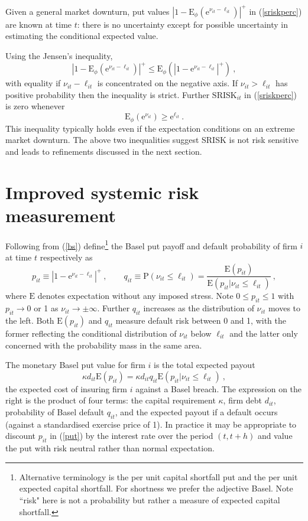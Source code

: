 \documentclass[authoryear]{elsarticle}
\newcommand{\E}{\mathrm{E}}
\newcommand{\p}{\mathrm{P}}
\newcommand{\e}{\mathrm{e}}
\newcommand{\Es}{\E_\phi}
\newcommand{\eref}[1]{(\ref{#1})}
\newcommand{\cq}{\ , \qquad}
\newcommand{\be}[1]{\begin{equation}\label{#1}}
\newcommand{\ee}{\end{equation}}
\begin{document}
Given a general market downturn, put values $|1-\Es(\e^{\nu_{it}-\ell_{it}})|^+$  in \eref{sriskperc} are known at time $t$:  there is no uncertainty except for possible  uncertainty in estimating the conditional  expected value.

Using the Jensen's inequality,
$$
\left|1-\Es(\e^{\nu_{it}-\ell_{it}})\right|^+ \le\Es\left(\left|1-\e^{\nu_{it}-\ell_{it}}\right|^+\right)\ ,
$$
with equality  if  $\nu_{it}-\ell_{it}$ is concentrated on the negative axis.  If  $\nu_{it}>\ell_{it}$  has positive probability then the  inequality is strict.   Further $\mathrm{SRISK}_{it}$ in \eref{sriskperc}   is zero whenever
$$
\Es(\e^{\nu_{it}})\ge\e^{\ell_{it}}\ .
$$
This inequality typically holds even if the expectation conditions on an extreme market downturn. The above two inequalities suggest SRISK is not risk sensitive and leads to refinements discussed in the next section.

\section{Improved systemic risk measurement}\label{improve}

Following from \eref{bs}   define\footnote{Alternative terminology is the per unit capital shortfall put and the per unit expected capital shortfall.  For shortness we prefer the adjective Basel.  Note ``risk" here is not a probability but rather a measure of expected capital shortfall.} the  Basel put payoff and default probability of firm $i$ at time $t$ respectively as
\be{put}
p_{it}\equiv \left|1-\e^{\nu_{it}-\ell_{it}}\right|^+\cq q_{it}\equiv \p(\nu_{it}\le \ell_{it})=\frac{\E(p_{it})}{\E(p_{it}|\nu_{it}\le \ell_{it})}\ ,
\ee
where $\E$ denotes expectation without any imposed stress.  Note $0\le p_{it}\le 1$ with $p_{it}\rightarrow 0$ or 1 as $\nu_{it}\rightarrow\pm\infty$.
Further $q_{it}$ increases as the distribution of $\nu_{it}$ moves to the left.  Both $\E(p_{it})$ and $q_{it}$ measure default risk between 0 and 1, with the former reflecting the conditional distribution of $\nu_{it}$ below $\ell_{it}$ and the latter only concerned with the probability mass in the same area.


The monetary Basel put value  for firm  $i$ is the total expected payout
$$
\kappa d_{it}\E(p_{it}) = \kappa d_{it}q_{it}\E(p_{it}|\nu_{it}\le \ell_{it})\ ,
$$
the expected cost of insuring firm $i$ against a Basel breach.  The expression on the right is the product of four terms: the capital requirement $\kappa$, firm debt $d_{it}$, probability of Basel default $q_{it}$, and the expected payout if a default occurs (against a standardised exercise price of 1). In practice it may be appropriate to discount $p_{it}$ in \eref{put} by the interest rate over the period $(t,t+h)$ and value the put with risk neutral rather than normal expectation.
\end{document}
